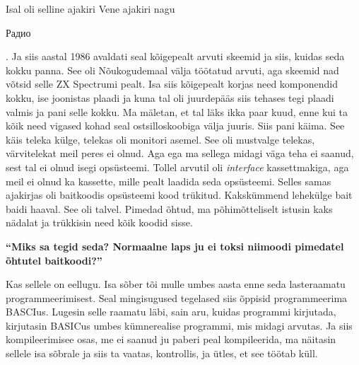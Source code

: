 Isal  oli selline ajakiri Vene ajakiri nagu 
\begin{russian}Радио\end{russian}. Ja siis aastal 1986 avaldati seal 
kõigepealt arvuti skeemid ja siis, kuidas seda kokku panna. See oli 
Nõukogudemaal välja töötatud arvuti, aga skeemid nad võtsid selle ZX Spectrumi 
pealt. Isa siis kõigepealt korjas need komponendid kokku, ise 
joonistas plaadi ja kuna tal oli juurdepääs siis tehases tegi plaadi valmis ja 
pani selle kokku. Ma mäletan, et tal läks ikka paar kuud, enne kui ta kõik need 
vigased kohad seal ostsilloskoobiga välja juuris. Siis pani käima. See käis 
teleka  külge,  telekas oli monitori asemel. See oli mustvalge telekas, 
värvitelekat  meil peres ei olnud.  Aga ega ma sellega  midagi väga teha ei 
saanud, sest tal ei olnud isegi opsüsteemi. Tollel arvutil oli \emph{interface} 
kassettmakiga, aga meil ei olnud ka kassette, mille pealt laadida seda 
opsüsteemi. Selles samas ajakirjas oli baitkoodis opsüsteemi kood trükitud. 
Kakskümmend lehekülge bait baidi haaval. See oli talvel. Pimedad õhtud, ma 
põhimõtteliselt istusin kaks nädalat ja trükkisin need kõik koodid sisse.

\textbf{\enquote{Miks sa tegid seda? Normaalne laps ju ei toksi niimoodi 
pimedatel õhtutel baitkoodi?}}

Kas sellele on eellugu. Isa sõber tõi mulle umbes aasta enne seda lasteraamatu  
programmeerimisest. Seal  mingisugused  tegelased siis õppisid programmeerima 
BASCIus. Lugesin selle raamatu läbi, sain aru, kuidas 
programmi kirjutada, kirjutasin BASICus umbes kümnerealise programmi, mis 
midagi arvutas. Ja siis kompileerimisee osas, me ei saanud ju paberi peal 
kompileerida, ma näitasin sellele isa sõbrale ja siis ta vaatas, kontrollis,  
ja ütles, et see töötab küll.

